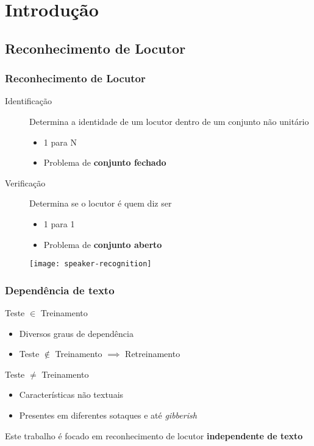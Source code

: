\section{Introdução}
\label{sec:intro}

\contentscurrent

\subsection{Reconhecimento de Locutor}

\begin{frame}
\frametitle{Reconhecimento de Locutor}
\begin{description}
    \item[Identificação] Determina a identidade de um locutor dentro de um conjunto não unitário
    \pause
    \begin{itemize}
        \item 1 para N
        \item Problema de \textbf{conjunto fechado}
        \pause
    \end{itemize}
    \item[Verificação] Determina se o locutor é quem diz ser
    \pause
    \begin{itemize}
        \item 1 para 1
        \item Problema de \textbf{conjunto aberto}
        \pause
    \end{itemize}
\end{description}

\begin{figure}
    \centering
    \texttt{[image: speaker-recognition]}
\end{figure}
\end{frame}

\begin{frame}
\frametitle{Dependência de texto}
\begin{description}
    \item[Com] Teste $\in$ Treinamento
    \pause
    \begin{itemize}
        \item Diversos graus de dependência
        \item Teste $\not\in$ Treinamento $\implies$ Retreinamento
        \pause
    \end{itemize}
    \item[Sem] Teste $\neq$ Treinamento
    \pause
    \begin{itemize}
        \item Características não textuais
        \item Presentes em diferentes sotaques e até \emph{gibberish}
        \pause
    \end{itemize}
    \item Este trabalho é focado em reconhecimento de locutor \textbf{independente de texto}
\end{description}
\end{frame}

